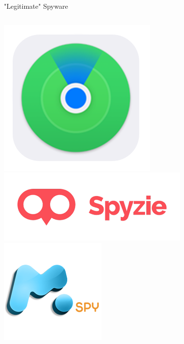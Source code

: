 \documentclass[nobackground,dvipsnames,table,aspectratio=169]{beamer}
\begin{document}
\begin{frame}{"Legitimate" Spyware}
\begin{columns}
            \includegraphics[width=\textwidth]{find-my-phone}
            \includegraphics[width=\textwidth]{spyzie}
            \includegraphics[width=\textwidth]{mspy}
    \end{columns}
\end{frame}
\end{document}
